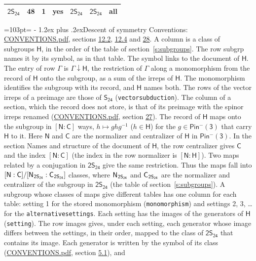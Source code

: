 \documentclass[10pt,a4paper]{article}
\makeatletter
\renewcommand\section{\@startsection{section}{1}{\z@}{-3ex plus -1ex minus -.2ex}%
  {1.2ex plus .2ex}{\normalfont\large\sffamily\bfseries\color{parttitle}}}
\newcommand{\needspace}[1]{\par\penalty-100\begingroup\dimen0=#1\relax\dimen2=\pagegoal
  \advance\dimen2-\pagetotal\ifdim\dimen0>\dimen2\relax\ifdim\dimen2>0pt\vfil\break\fi\fi
  \endgroup}
\numberwithin{equation}{section}
\newcommand{\grp}[1]{\mathsf{#1}}
\newcommand{\grpindex}[2]{[#1 : #2]}
\newcommand{\restr}[2]{#1\!\downarrow#2}
\newcommand{\hairsp}{\mkern1mu}
\newlength{\fillwidth}\newlength{\cellwidth}\newlength{\colwidth}
\makeatother
\begin{document}
{\begin{longtable}{@{}lrrlll>{\RaggedRight\arraybackslash}p{\fillwidth}@{}}
\href{2S24.pdf}{$\grp{2S_{24}}$} & 48 & 1 & yes & \href{2S24.pdf}{$\grp{2S_{24}}$} & \href{2S24.pdf}{$\grp{2S_{24}}$} & all\\
\bottomrule\end{longtable}}
\needspace{103pt}
\section{Descent of symmetry}\label{s:subduction}
Conventions: \href{../../CONVENTIONS.pdf}{CONVENTIONS.pdf}, sections \href{../../../rotation/CONVENTIONS.pdf\#conv.12.2}{12.2}, \href{../../../rotation/CONVENTIONS.pdf\#conv.12.4}{12.4} and \href{../../CONVENTIONS.pdf\#conv.28}{28}.
A column is a class of subgroups $\grp{H}$, in the order of the table of section~\ref{s:subgroups}. The row subgrp names it by its symbol, as in that table. The symbol links to the document of $\grp{H}$. The entry of row $\Gamma$ is $\restr{\Gamma}{\grp{H}}$, the restriction of $\Gamma$ along a monomorphism from the record of $\grp{H}$ onto the subgroup, as a sum of the irreps of $\grp{H}$. The monomorphism identifies the subgroup with its record, and $\grp{H}$ names both. The rows of the vector irreps of a preimage are those of \href{../../../rotation/data/pdf/S24.pdf}{$\grp{S_{24}}$} (\texttt{vectorsubduction}). The column of a section, which the record does not store, is that of its preimage with the spinor irreps renamed (\href{../../CONVENTIONS.pdf}{CONVENTIONS.pdf}, section \href{../../CONVENTIONS.pdf\#conv.27}{27}). \label{n:group.normalizer.o3}\label{n:group.centralizer.o3}\label{n:element.h}The record of $\grp{H}$ maps onto the subgroup in $\grpindex{\grp{N}}{\grp{C}}$ ways, $h \mapsto g h g^{-1}$ ($h \in \grp{H}$) for the $g \in \grp{Pin^{-}(3)}$ that carry $\grp{H}$ to it. Here $\grp{N}$ and $\grp{C}$ are the normalizer and centralizer of $\grp{H}$ in \href{Pinminus3.pdf}{$\grp{Pin^{-}(3)}$}. In the section Names and structure of the document of $\grp{H}$, the row centralizer gives $\grp{C}$ and the index $\grpindex{\grp{N}}{\grp{C}}$ (the index in the row normalizer is $\grpindex{\grp{N}}{\grp{H}}$). Two maps related by a conjugation in $\grp{2S_{24}}$ give the same restriction. Thus the maps fall into $\grpindex{\grp{N}}{\grp{C}}/\grpindex{\grp{N}_{\hairsp \grp{2S_{24}}}}{\grp{C}_{\hairsp \grp{2S_{24}}}}$ classes, where $\grp{N}_{\hairsp \grp{2S_{24}}}$ and $\grp{C}_{\hairsp \grp{2S_{24}}}$ are the normalizer and centralizer of the subgroup in $\grp{2S_{24}}$ (the table of section~\ref{s:subgroups}). \label{n:head.setting}A subgroup whose classes of maps give different tables has one column for each table: setting 1 for the stored monomorphism (\texttt{monomorphism}) and settings 2, 3, \dots{} for the \texttt{alternativesettings}. Each setting has the images of the generators of $\grp{H}$ (\texttt{setting}). \label{n:head.images}The row images gives, under each setting, each generator whose image differs between the settings, in their order, mapped to the class of $\grp{2S_{24}}$ that contains its image. Each generator is written by the symbol of its class (\href{../../CONVENTIONS.pdf}{CONVENTIONS.pdf}, section \href{../../../rotation/CONVENTIONS.pdf\#conv.5.1}{5.1}), and 
\end{document}
